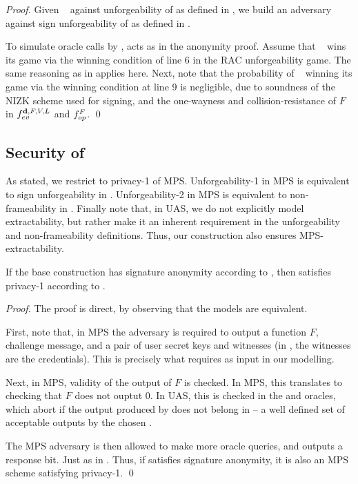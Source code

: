 \begin{proof}
  Given \adv~ against unforgeability of \CUASRAC as defined in
  , we build an adversary \advB against sign
  unforgeability of \CUASGen as defined in .

  To simulate oracle calls by \adv, \advB acts as in the anonymity proof. Assume
  that \adv~ wins its game via the winning condition of line 6 in the RAC
  unforgeability game. The same reasoning as in \CUASAC applies here. Next, note
  that the probability of \adv~ winning its game via the winning condition at
  line 9 is negligible, due to soundness of the NIZK scheme used for signing,
  and the one-wayness and collision-resistance of $F$ in
  $f_{ev}^{\mathbf{d},F,V,L}$ and $f_{op}^{F}$.
  \qed
\end{proof}

\subsection{Security of \CUASMPS}

As stated, we restrict to privacy-1 of MPS. Unforgeability-1 in MPS is
equivalent to sign unforgeability in \UAS. Unforgeability-2 in MPS is
equivalent to non-frameability in \UAS. Finally note that, in UAS, we do not
explicitly model extractability, but rather make it an inherent requirement in
the unforgeability and non-frameability definitions. Thus, our \CUASMPS
construction also ensures MPS-extractability.

\begin{theorem}
  If the base \CUASGen construction has signature anonymity according to
  , then \CUASMPS satisfies privacy-1
  according to \needcite.
\end{theorem}

\begin{proof}
  The proof is direct, by observing that the models are equivalent.
  
  First, note that, in MPS the adversary is required to output a function $F$,
  challenge message, and a pair of user secret keys and witnesses (in \UAS, the
  witnesses are the credentials). This is precisely what \CHALb requires as
  input in our \UAS modelling.

  Next, in MPS, validity of the output of $F$ is checked. In MPS, this
  translates to checking that $F$ does not ouptut $0$. In UAS, this is checked
  in the \SIGN and \CHALb oracles, which abort if the output produced by \feval
  does not belong in \rngfeval -- a well defined set of acceptable outputs by
  the chosen \feval.

  The MPS adversary is then allowed to make more oracle queries, and outputs a
  response bit. Just as in \UAS. Thus, if \CUASMPS satisfies signature
  anonymity, it is also an MPS scheme satisfying privacy-1.  
  \qed
\end{proof}

